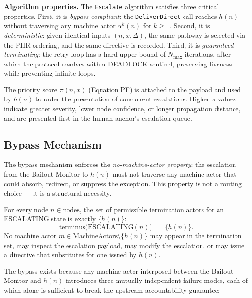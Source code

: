 \bigskip
\noindent\textbf{Algorithm properties.} The \texttt{Escalate} algorithm satisfies three critical properties. First, it is \emph{bypass-compliant}: the \texttt{DeliverDirect} call reaches $h(n)$ without traversing any machine actor $\alpha^k(n)$ for $k \geq 1$. Second, it is \emph{deterministic}: given identical inputs $(n, x, \Delta)$, the same pathway is selected via the PHR ordering, and the same directive is recorded. Third, it is \emph{guaranteed-terminating}: the retry loop has a hard upper bound of $N_{\max}$ iterations, after which the protocol resolves with a DEADLOCK sentinel, preserving liveness while preventing infinite loops.

The priority score $\pi(n, x)$ (Equation PF) is attached to the payload and used by $h(n)$ to order the presentation of concurrent escalations. Higher $\pi$ values indicate greater severity, lower node confidence, or longer propagation distance, and are presented first in the human anchor's escalation queue.

\subsection{Bypass Mechanism}\label{sec:bypass}

The bypass mechanism enforces the \emph{no-machine-actor property}: the escalation from the Bailout Monitor to $h(n)$ must not traverse any machine actor that could absorb, redirect, or suppress the exception. This property is not a routing choice — it is a structural necessity.

\bigskip
\begin{definition}\label{def:bypass}
For every node $n \in \text{nodes}$, the set of permissible termination actors for an ESCALATING state is exactly $\{h(n)\}$:
\begin{equation}
\text{terminus}\bigl(\text{ESCALATING}(n)\bigr) \;=\; \{h(n)\}. \tag{BP}
\end{equation}
No machine actor $m \in \text{MachineActors} \setminus \{h(n)\}$ may appear in the termination set, may inspect the escalation payload, may modify the escalation, or may issue a directive that substitutes for one issued by $h(n)$.
\end{definition}

The bypass exists because any machine actor interposed between the Bailout Monitor and $h(n)$ introduces three mutually independent failure modes, each of which alone is sufficient to break the upstream accountability guarantee:


